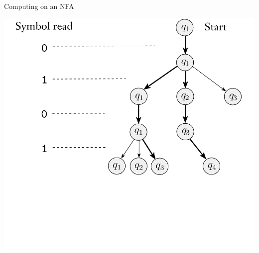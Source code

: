 \documentclass[aspectratio=169]{beamer}
\begin{document}
\begin{frame}{Computing on an NFA}
    \begin{center}
        \includegraphics[scale=0.80]{N1_compute/N1_4.png}
    \end{center}
\end{frame}
\end{document}
